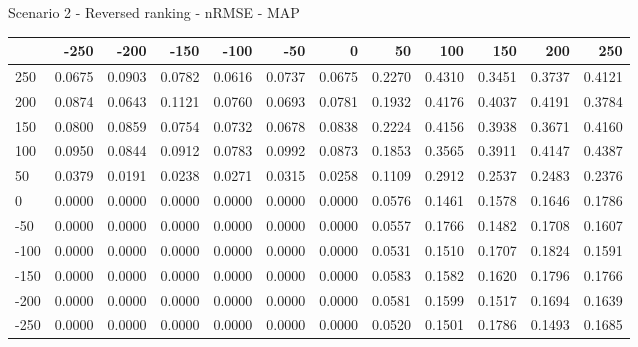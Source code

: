 Scenario 2 - Reversed ranking - nRMSE - MAP
\begin{tabular}{lrrrrrrrrrrr}
\toprule
{} &   -250 &   -200 &   -150 &   -100 &   -50  &    0   &    50  &    100 &    150 &    200 &    250 \\
\midrule
 250 & 0.0675 & 0.0903 & 0.0782 & 0.0616 & 0.0737 & 0.0675 & 0.2270 & 0.4310 & 0.3451 & 0.3737 & 0.4121 \\
 200 & 0.0874 & 0.0643 & 0.1121 & 0.0760 & 0.0693 & 0.0781 & 0.1932 & 0.4176 & 0.4037 & 0.4191 & 0.3784 \\
 150 & 0.0800 & 0.0859 & 0.0754 & 0.0732 & 0.0678 & 0.0838 & 0.2224 & 0.4156 & 0.3938 & 0.3671 & 0.4160 \\
 100 & 0.0950 & 0.0844 & 0.0912 & 0.0783 & 0.0992 & 0.0873 & 0.1853 & 0.3565 & 0.3911 & 0.4147 & 0.4387 \\
 50  & 0.0379 & 0.0191 & 0.0238 & 0.0271 & 0.0315 & 0.0258 & 0.1109 & 0.2912 & 0.2537 & 0.2483 & 0.2376 \\
 0   & 0.0000 & 0.0000 & 0.0000 & 0.0000 & 0.0000 & 0.0000 & 0.0576 & 0.1461 & 0.1578 & 0.1646 & 0.1786 \\
-50  & 0.0000 & 0.0000 & 0.0000 & 0.0000 & 0.0000 & 0.0000 & 0.0557 & 0.1766 & 0.1482 & 0.1708 & 0.1607 \\
-100 & 0.0000 & 0.0000 & 0.0000 & 0.0000 & 0.0000 & 0.0000 & 0.0531 & 0.1510 & 0.1707 & 0.1824 & 0.1591 \\
-150 & 0.0000 & 0.0000 & 0.0000 & 0.0000 & 0.0000 & 0.0000 & 0.0583 & 0.1582 & 0.1620 & 0.1796 & 0.1766 \\
-200 & 0.0000 & 0.0000 & 0.0000 & 0.0000 & 0.0000 & 0.0000 & 0.0581 & 0.1599 & 0.1517 & 0.1694 & 0.1639 \\
-250 & 0.0000 & 0.0000 & 0.0000 & 0.0000 & 0.0000 & 0.0000 & 0.0520 & 0.1501 & 0.1786 & 0.1493 & 0.1685 \\
\bottomrule
\end{tabular}

